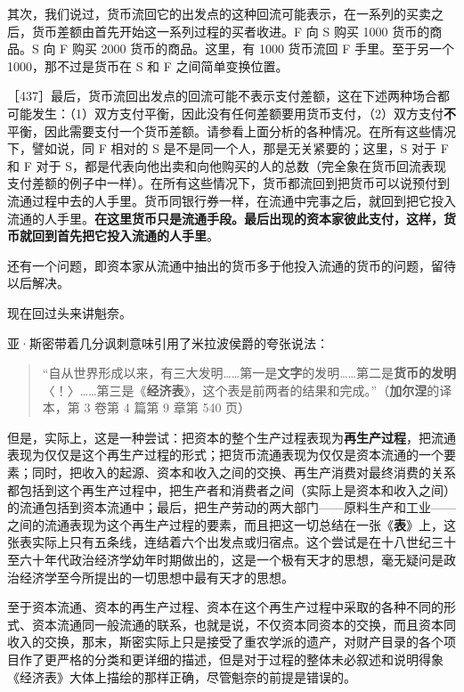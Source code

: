 其次，我们说过，货币流回它的出发点的这种回流可能表示，在一系列的买卖之后，货币差额由首先开始这一系列过程的买者收进。F 向 S 购买 1000 货币的商品。S 向 F 购买 2000 货币的商品。这里，有 1000 货币流回 F 手里。至于另一个 1000，那不过是货币在 S 和 F 之间简单变换位置。

［437］最后，货币流回出发点的回流可能不表示支付差额，这在下述两种场合都可能发生：（1）双方支付平衡，因此没有任何差额要用货币支付，（2）双方支付\textbf{不}平衡，因此需要支付一个货币差额。请参看上面分析的各种情况。在所有这些情况下，譬如说，同 F 相对的 S 是不是同一个人，那是无关紧要的；这里，S 对于 F 和 F 对于 S，都是代表向他出卖和向他购买的人的总数（完全象在货币回流表现支付差额的例子中一样）。在所有这些情况下，货币都流回到把货币可以说预付到流通过程中去的人手里。货币同银行券一样，在流通中完事之后，就回到把它投入流通的人手里。\textbf{在这里货币只是流通手段。最后出现的资本家彼此支付，这样，货币就回到首先把它投入流通的人手里}。

还有一个问题，即资本家从流通中抽出的货币多于他投入流通的货币的问题，留待以后解决。


现在回过头来讲魁奈。

亚·斯密带着几分讽刺意味引用了米拉波侯爵的夸张说法：

\begin{quote}“自从世界形成以来，有三大发明……第一是\textbf{文字}的发明……第二是\textbf{货币的发明}〈！〉……第三是《\textbf{经济表}》，这个表是前两者的结果和完成。”（\textbf{加尔涅}的译本，第 3 卷第 4 篇第 9 章第 540 页）\end{quote}

但是，实际上，这是一种尝试：把资本的整个生产过程表现为\textbf{再生产过程}，把流通表现为仅仅是这个再生产过程的形式；把货币流通表现为仅仅是资本流通的一个要素；同时，把收入的起源、资本和收入之间的交换、再生产消费对最终消费的关系都包括到这个再生产过程中，把生产者和消费者之间（实际上是资本和收入之间）的流通包括到资本流通中；最后，把生产劳动的两大部门——原料生产和工业——之间的流通表现为这个再生产过程的要素，而且把这一切总结在一张《\textbf{表}》上，这张表实际上只有五条线，连结着六个出发点或归宿点。这个尝试是在十八世纪三十至六十年代政治经济学幼年时期做出的，这是一个极有天才的思想，毫无疑问是政治经济学至今所提出的一切思想中最有天才的思想。

至于资本流通、资本的再生产过程、资本在这个再生产过程中采取的各种不同的形式、资本流通同一般流通的联系，也就是说，不仅资本同资本的交换，而且资本同收入的交换，那末，斯密实际上只是接受了重农学派的遗产，对财产目录的各个项目作了更严格的分类和更详细的描述，但是对于过程的整体未必叙述和说明得象《经济表》大体上描绘的那样正确，尽管魁奈的前提是错误的。

